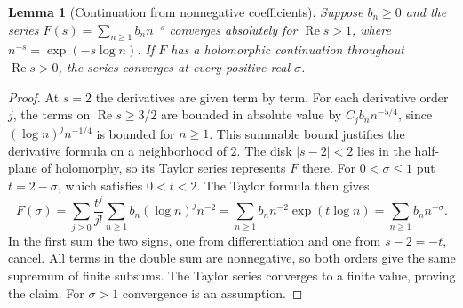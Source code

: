 \documentclass[11pt,oneside,openany]{book}
\theoremstyle{plain}
\newtheorem{lemma}[theorem]{Lemma}
\theoremstyle{definition}
\theoremstyle{remark}
\begin{document}
\begin{lemma}[Continuation from nonnegative coefficients]
\label{lem:nt-dirichlet-positive-series}
Suppose \(b_n\ge0\) and the series
\(F(s)=\sum_{n\ge1}b_n n^{-s}\) converges absolutely for
\(\operatorname{Re}s>1\), where \(n^{-s}=\exp(-s\log n)\).
If \(F\) has a holomorphic continuation throughout
\(\operatorname{Re}s>0\), the series converges at every positive
real \(\sigma\).
\end{lemma}
\begin{proof}
At \(s=2\) the derivatives are given term by term. For each
derivative order \(j\), the terms on \(\operatorname{Re}s\ge3/2\)
are bounded in absolute value by \(C_j b_n n^{-5/4}\), since
\((\log n)^j n^{-1/4}\) is bounded for \(n\ge1\). This summable
bound justifies the derivative formula on a neighborhood of \(2\).
The disk \(|s-2|<2\) lies in the half-plane of holomorphy,
so its Taylor series represents \(F\) there. For \(0<\sigma\le1\)
put \(t=2-\sigma\), which satisfies \(0<t<2\). The Taylor formula
then gives
\[
 F(\sigma)
 =\sum_{j\ge0}\frac{t^j}{j!}\sum_{n\ge1}b_n(\log n)^j n^{-2}
 =\sum_{n\ge1}b_n n^{-2}\exp(t\log n)
 =\sum_{n\ge1}b_n n^{-\sigma}.
\]
In the first sum the two signs, one from differentiation and one
from \(s-2=-t\), cancel. All terms in the double sum are nonnegative,
so both orders give the same supremum of finite subsums. The
Taylor series converges to a finite value, proving the claim.
For \(\sigma>1\) convergence is an assumption.
\end{proof}
\end{document}
